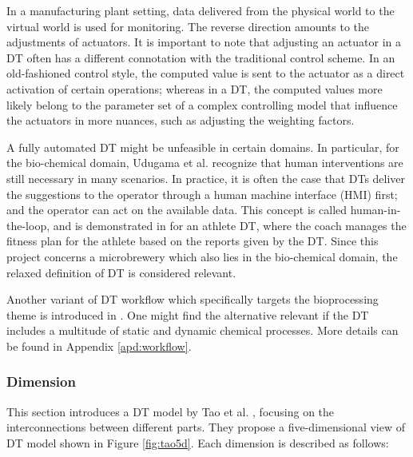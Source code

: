 In a manufacturing plant setting, data delivered from the physical world to the virtual world is used for monitoring. The reverse direction amounts to the adjustments of actuators. It is important to note that adjusting an actuator in a DT often has a different connotation with the traditional control scheme. In an old-fashioned control style, the computed value is sent to the actuator as a direct activation of certain operations; whereas in a DT, the computed values more likely belong to the parameter set of a complex controlling model that influence the actuators in more nuances, such as adjusting the weighting factors.

A fully automated DT might be unfeasible in certain domains. In particular, for the bio-chemical domain, Udugama et al. \cite{Udugama2020, Udugama2021} recognize that human interventions are still necessary in many scenarios. In practice, it is often the case that DTs deliver the suggestions to the operator through a human machine interface (HMI) first; and the operator can act on the available data. This concept is called human-in-the-loop, and is demonstrated in \cite{Barricelli2020} for an athlete DT, where the coach manages the fitness plan for the athlete based on the reports given by the DT. Since this project concerns a microbrewery which also lies in the bio-chemical domain, the relaxed definition of DT is considered relevant.    

Another variant of DT workflow which specifically targets the bioprocessing theme is introduced in \cite{Udugama2021}. One might find the alternative relevant if the DT includes a multitude of static and dynamic chemical processes. More details can be found in Appendix \ref{apd:workflow}.

\subsubsection{Dimension}
This section introduces a DT model by Tao et al. \cite{Tao2017}, focusing on the interconnections between different parts. They propose a five-dimensional view of DT model shown in Figure \ref{fig:tao5d}. Each dimension is described as follows:

